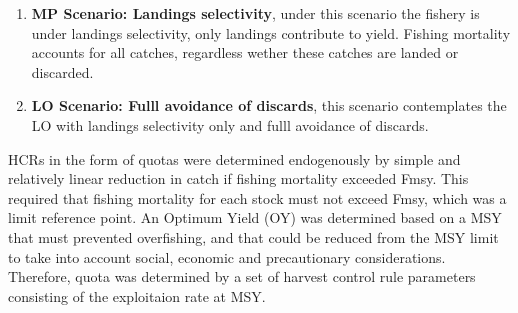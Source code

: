 \documentclass[12pt,oneline,a4paper,numbib]{ouparticle}
\numberwithin{equation}{subsection} %
\begin{document}
\begin{table}[!h]
\centering
\caption{}
\label{scenarios}
\end{table}
 
\begin{enumerate}

\item
\textbf{MP Scenario: Landings selectivity},  under this scenario the fishery is under landings selectivity, only landings contribute to yield. Fishing mortality accounts for all catches, regardless wether these catches are landed or discarded.

\item
\textbf{LO Scenario: Fulll avoidance of discards}, this scenario contemplates the LO with landings selectivity only and fulll avoidance of discards.


\end{enumerate}

HCRs in the form of quotas were determined endogenously by simple and relatively linear reduction in catch if fishing mortality exceeded Fmsy. This required that fishing mortality for each stock must not exceed Fmsy, which was a limit reference point. An Optimum Yield (OY) was determined based on a MSY that must prevented overfishing, and that could be reduced from the MSY limit to take into account social, economic and precautionary considerations.  Therefore, quota was determined by a set of harvest control rule parameters consisting of the exploitaion rate at MSY.
\end{document}
